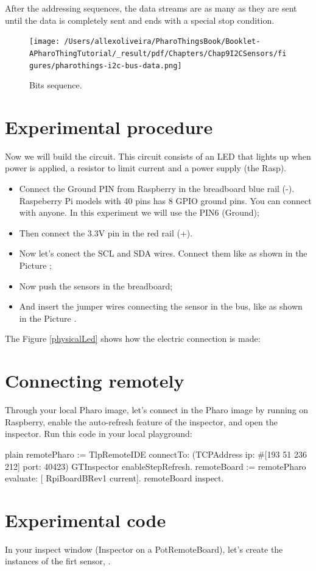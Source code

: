 \documentclass[10pt,twoside,english]{_support/latex/sbabook/sbabook}
\begin{document}
After the addressing sequences, the data streams are as many as they are sent until the data is completely sent and ends with a special stop condition.


\begin{figure}

\begin{center}
\texttt{[image: /Users/allexoliveira/PharoThingsBook/Booklet-APharoThingTutorial/\_result/pdf/Chapters/Chap9I2CSensors/figures/pharothings-i2c-bus-data.png]}\caption{Bits sequence.\label{I2CBusPacket}}\end{center}
\end{figure}

\section{Experimental procedure}
Now we will build the circuit. This circuit consists of an LED that lights up when power is applied, a resistor to limit current and a power supply (the Rasp).

\begin{itemize}
\item Connect the Ground PIN from Raspberry in the breadboard blue rail (-). Raspeberry Pi models with 40 pins has 8 GPIO ground pins. You can connect with anyone. In this experiment we will use the PIN6 (Ground);
\item Then connect the 3.3V pin in the red rail (+). 
\item Now let's conect the SCL and SDA wires. Connect them like as shown in the Picture ;
\item Now push the sensors in the breadboard;
\item And insert the jumper wires connecting the sensor in the bus, like as shown in the Picture .
\end{itemize}

The Figure \ref{physicalLed} shows how the electric connection is made:
\section{Connecting remotely}
Through your local Pharo image, let’s connect in the Pharo image by running on Raspberry, enable the auto-refresh feature of the inspector, and open the inspector.
Run this code in your local playground:

\begin{displaycode}{plain}
remotePharo := TlpRemoteIDE connectTo: (TCPAddress ip: #[193 51 236 212] port: 40423)
GTInspector enableStepRefresh.
remoteBoard := remotePharo evaluate: [ RpiBoardBRev1 current].
remoteBoard inspect.
\end{displaycode}
\section{Experimental code}
In your inspect window (Inspector on a PotRemoteBoard), let’s create the instances of the firt sensor, .


\backmatter

\end{document}
